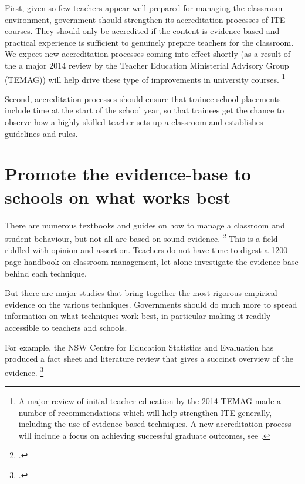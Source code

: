 \documentclass{grattan}
\begin{document}
First, given so few teachers appear well prepared for managing the classroom environment, government should strengthen its accreditation processes of ITE courses. They should only be accredited if the content is evidence based and practical experience is sufficient to genuinely prepare teachers for the classroom.
We expect new accreditation processes coming into effect shortly (as a result of the a major 2014 review by the Teacher Education Ministerial Advisory Group (TEMAG)) will help drive these type of improvements in university courses.%
    \footnote{A major review of initial teacher education by the 2014 TEMAG made a number of recommendations which will help strengthen ITE generally, including the use of evidence-based techniques. A new accreditation process will include a focus on achieving successful graduate outcomes, see \textcite{TEMAG2016ActionNowClassroom}.}

Second, accreditation processes should ensure that trainee school placements include time at the start of the school year, so that trainees get the chance to observe how a highly skilled teacher sets up a classroom and establishes guidelines and rules.

\section{Promote the evidence-base to schools on what works best }\label{sec:provide-information-teachers}
There are numerous textbooks and guides on how to manage a classroom and student behaviour, but not all are based on sound evidence.%
    \footcite{ONeillStephenson2014EvidenceBasedClassroom}
This is a field riddled with opinion and assertion. Teachers do not have time to digest a 1200-page handbook on classroom management, let alone investigate the evidence base behind each technique.

But there are major studies that bring together the most rigorous empirical evidence on the various techniques. Governments should do much more to spread information on what techniques work best, in particular making it readily accessible to teachers and schools.

For example, the NSW Centre for Education Statistics and Evaluation has produced a fact sheet and literature review that gives a succinct overview of the evidence.%
    \footcites{CESE2014ClassroomManagement}{CESE2014WhatEffectiveClassroom}
\end{document}
